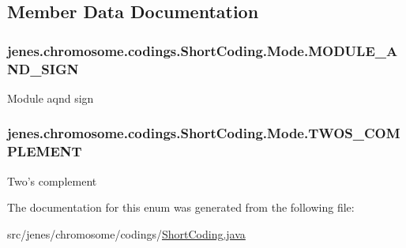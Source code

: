 \subsection{Member Data Documentation}
\hypertarget{enumjenes_1_1chromosome_1_1codings_1_1_short_coding_1_1_mode_ad2f4c4c2396201d3f545dfb7bf4d5f7f}{
\subsubsection[{M\-O\-D\-U\-L\-E\-\_\-\-A\-N\-D\-\_\-\-S\-I\-G\-N}]{\setlength{\rightskip}{0pt plus 5cm}jenes.\-chromosome.\-codings.\-Short\-Coding.\-Mode.\-M\-O\-D\-U\-L\-E\-\_\-\-A\-N\-D\-\_\-\-S\-I\-G\-N}}\label{enumjenes_1_1chromosome_1_1codings_1_1_short_coding_1_1_mode_ad2f4c4c2396201d3f545dfb7bf4d5f7f}
Module aqnd sign \hypertarget{enumjenes_1_1chromosome_1_1codings_1_1_short_coding_1_1_mode_a854a732d2e03e2abae158628431dc66d}{
\subsubsection[{T\-W\-O\-S\-\_\-\-C\-O\-M\-P\-L\-E\-M\-E\-N\-T}]{\setlength{\rightskip}{0pt plus 5cm}jenes.\-chromosome.\-codings.\-Short\-Coding.\-Mode.\-T\-W\-O\-S\-\_\-\-C\-O\-M\-P\-L\-E\-M\-E\-N\-T}}\label{enumjenes_1_1chromosome_1_1codings_1_1_short_coding_1_1_mode_a854a732d2e03e2abae158628431dc66d}
Two's complement 

The documentation for this enum was generated from the following file\-:\begin{DoxyCompactItemize}
\item 
src/jenes/chromosome/codings/\hyperlink{_short_coding_8java}{Short\-Coding.\-java}\end{DoxyCompactItemize}
